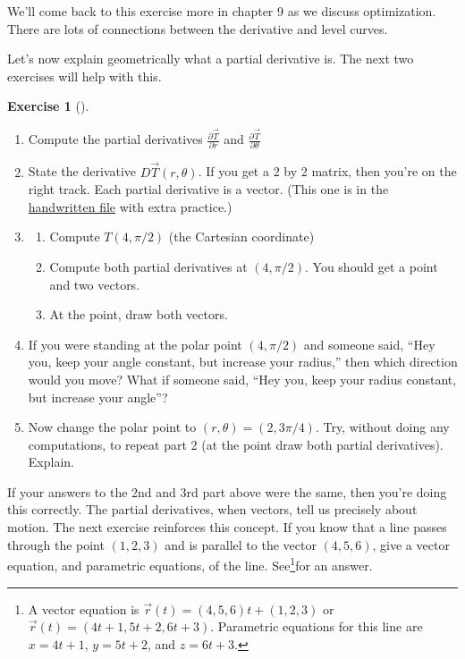 \documentclass[10pt,]{book}
\theoremstyle{plain}
\theoremstyle{definition}
\theoremstyle{definition}
\theoremstyle{definition}
\theoremstyle{definition}
\newtheorem{exploration}[project]{Exercise}
\theoremstyle{definition}
\numberwithin{equation}{section}
\newcommand{\ds}{\displaystyle}
\begin{document}
We'll come back to this exercise more in chapter 9 as we discuss optimization. There are lots of connections between the derivative and level curves.%
\par
Let's now explain geometrically what a partial derivative is. The next two exercises will help with this.%
\begin{exploration}[]\label{exploration-139}
\leavevmode%
\begin{enumerate}[font=\bfseries,label=(\alph*),ref=\alph*]
\item\label{task-292} Compute the partial derivatives \(\ds\frac{\partial \vec T}{\partial r}\) and \(\ds\frac{\partial \vec T}{\partial \theta}\)%
\item\label{task-293} State the derivative \(D\vec T(r,\theta)\). If you get a 2 by 2 matrix, then you're on the right track. Each partial derivative is a vector. (This one is in the \href{http://db.tt/cSeKG8XO}{handwritten file} with extra practice.)%
%
\item\label{task-294} \begin{enumerate}[font=\bfseries,label=(\roman*),ref=\theenumi.\roman*]
\item\label{task-295} Compute \(T(4,\pi/2)\) (the Cartesian coordinate)%
\item\label{task-296} Compute both partial derivatives at \((4,\pi/2)\). You should get a point and two vectors.%
%
\item\label{task-297} At the point, draw both vectors.%
\end{enumerate}
\item\label{task-298} If you were standing at the polar point \((4,\pi/2)\) and someone said, ``Hey you, keep your angle constant, but increase your radius,'' then which direction would you move?  What if someone said, ``Hey you, keep your radius constant, but increase your angle''?%
\item\label{task-299} Now change the polar point to \((r,\theta) = (2,3\pi/4)\).  Try, without doing  any computations, to repeat part 2 (at the point draw both partial derivatives). Explain.%
\end{enumerate}
\end{exploration}
If your answers to the 2nd and 3rd part above were the same, then you're doing this correctly. The partial derivatives, when vectors, tell us precisely about motion. The next exercise reinforces this concept.%
If you know that a line passes through the point \((1,2,3)\) and is parallel to the vector \((4,5,6)\), give a vector equation, and parametric equations, of the line. See\footnote{A vector equation is \(\vec r(t) = (4,5,6)t+(1,2,3)\) or \(\vec r(t) = (4t+1, 5t+2, 6t+3)\).  Parametric equations for this line are \(x=4t+1\), \(y=5t+2\), and \(z=6t+3\).\label{fn-1}}for an answer.%
\end{document}
